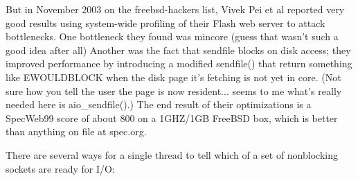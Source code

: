 \documentclass[twoside, xetex]{report}
\begin{document}
But in November 2003 on the freebsd-hackers list, Vivek Pei et al reported very good results using system-wide profiling of their Flash web server to attack bottlenecks. One bottleneck they found was mincore (guess that wasn't such a good idea after all) Another was the fact that sendfile blocks on disk access; they improved performance by introducing a modified sendfile() that return something like EWOULDBLOCK when the disk page it's fetching is not yet in core. (Not sure how you tell the user the page is now resident... seems to me what's really needed here is aio\_sendfile().) The end result of their optimizations is a SpecWeb99 score of about 800 on a 1GHZ/1GB FreeBSD box, which is better than anything on file at spec.org.

There are several ways for a single thread to tell which of a set of nonblocking sockets are ready for I/O:
\end{document}
